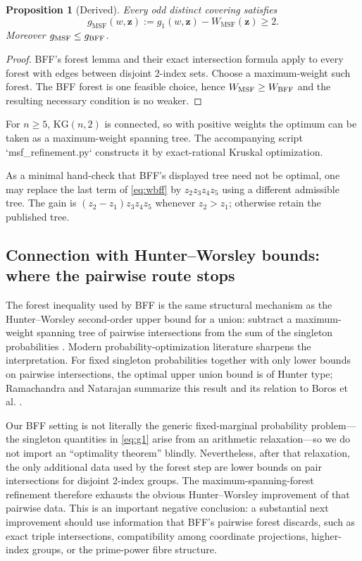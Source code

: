 \documentclass[11pt]{article}
\newtheorem{proposition}[theorem]{Proposition}
\theoremstyle{definition}
\newcommand{\kg}{\mathrm{KG}}
\newcommand{\MSF}{\mathrm{MSF}}
\begin{document}
\begin{proposition}[Derived]
Every odd distinct covering satisfies
\begin{equation}\label{eq:gmsf}
 g_{\MSF}(w,\mathbf z)
 :=g_1(w,\mathbf z)-W_{\MSF}(\mathbf z)\ge2.
\end{equation}
Moreover $g_{\MSF}\le g_{\rm BFF}$.
\end{proposition}

\begin{proof}
BFF's forest lemma and their exact intersection formula apply to every forest with edges between
disjoint 2-index sets.  Choose a maximum-weight such forest.  The BFF forest is one feasible
choice, hence $W_{\MSF}\ge W_{\rm BFF}$ and the resulting necessary condition is no weaker.
\end{proof}

For $n\ge5$, $\kg(n,2)$ is connected, so with positive weights the optimum can be taken as a
maximum-weight spanning tree.  The accompanying script `msf\_refinement.py` constructs it by
exact-rational Kruskal optimization.

As a minimal hand-check that BFF's displayed tree need not be optimal, one may replace the last
term of \eqref{eq:wbff} by $z_2z_3z_4z_5$ using a different admissible tree.  The gain is
$(z_2-z_1)z_3z_4z_5$ whenever $z_2>z_1$; otherwise retain the published tree.

\subsection{Connection with Hunter--Worsley bounds: where the pairwise route stops}

The forest inequality used by BFF is the same structural mechanism as the Hunter--Worsley
second-order upper bound for a union: subtract a maximum-weight spanning tree of pairwise
intersections from the sum of the singleton probabilities \cite{Hunter1976,Worsley1982}.
Modern probability-optimization literature sharpens the interpretation.  For fixed singleton
probabilities together with only lower bounds on pairwise intersections, the optimal upper union
bound is of Hunter type; Ramachandra and Natarajan summarize this result and its relation to
Boros et al. \cite{BorosEtAl2014,RamachandraNatarajan2023}.

Our BFF setting is not literally the generic fixed-marginal probability problem---the singleton
quantities in \eqref{eq:g1} arise from an arithmetic relaxation---so we do not import an
``optimality theorem'' blindly.  Nevertheless, after that relaxation, the only additional data
used by the forest step are lower bounds on pair intersections for disjoint 2-index groups.  The
maximum-spanning-forest refinement therefore exhausts the obvious Hunter--Worsley improvement of
that pairwise data.  This is an important negative conclusion: a substantial next improvement
should use information that BFF's pairwise forest discards, such as exact triple intersections,
compatibility among coordinate projections, higher-index groups, or the prime-power fibre
structure.
\end{document}

